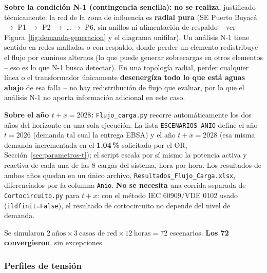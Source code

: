 \documentclass[11pt,a4paper]{article}
\begin{document}
\textbf{Sobre la condici\'on N-1 (contingencia sencilla):} \textbf{no se realiza}, justificado t\'ecnicamente: la red de la zona de influencia es \textbf{radial pura} (SE Puerto Boyac\'a $\to$ P1 $\to$ P2 $\to$ \ldots $\to$ P6, sin anillos ni alimentaci\'on de respaldo -- ver Figura~\ref{fig:demanda-generacion} y el diagrama unifilar). Un an\'alisis N-1 tiene sentido en redes malladas o con respaldo, donde perder un elemento redistribuye el flujo por caminos alternos (lo que puede generar sobrecargas en otros elementos -- eso es lo que N-1 busca detectar). En una topolog\'ia radial, perder cualquier l\'inea o el transformador \'unicamente \textbf{desenerg\'iza todo lo que est\'a aguas abajo} de esa falla -- no hay redistribuci\'on de flujo que evaluar, por lo que el an\'alisis N-1 no aporta informaci\'on adicional en este caso.

\textbf{Sobre el a\~no $t+x=2028$:} \texttt{Flujo\_carga.py} recorre autom\'aticamente los dos a\~nos del horizonte en una sola ejecuci\'on. La lista \texttt{ESCENARIOS\_ANIO} define el a\~no $t=2026$ (demanda tal cual la entrega EBSA) y el a\~no $t+x=2028$ (esa misma demanda incrementada en el \textbf{1.04\,\%} solicitado por el OR, Secci\'on~\ref{sec:parametros-t}); el script escala por s\'i mismo la potencia activa y reactiva de cada una de las 8 cargas del sistema, hora por hora. Los resultados de ambos a\~nos quedan en un \'unico archivo, \texttt{Resultados\_Flujo\_Carga.xlsx}, diferenciados por la columna \texttt{Anio}. \textbf{No se necesita} una corrida separada de \texttt{Cortocircuito.py} para $t+x$: con el m\'etodo IEC 60909/VDE 0102 usado (\texttt{ildfinit=False}), el resultado de cortocircuito no depende del nivel de demanda.

Se simularon $2\ \text{a\~nos} \times 3\ \text{casos de red} \times 12\ \text{horas} = 72$ escenarios. \textbf{Los 72 convergieron}, sin excepciones.

\subsubsection*{Perfiles de tensi\'on}
\end{document}
